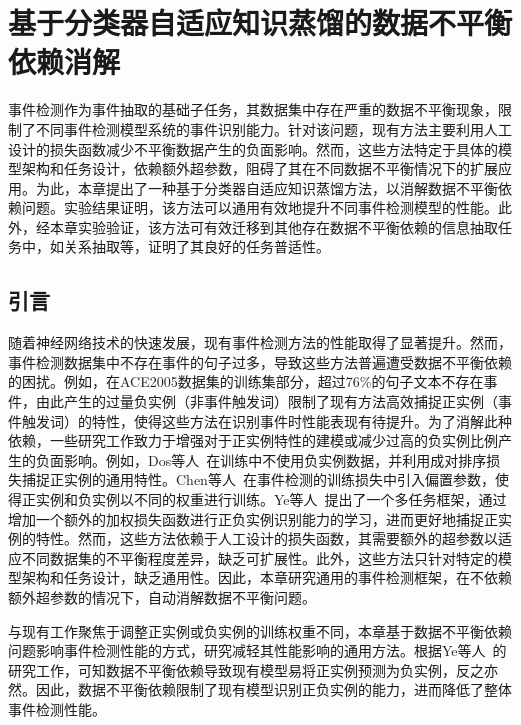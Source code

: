 \chapter{基于分类器自适应知识蒸馏的数据不平衡依赖消解}
\label{chap:chapter3}

事件检测作为事件抽取的基础子任务，其数据集中存在严重的数据不平衡现象，限制了不同事件检测模型系统的事件识别能力。针对该问题，现有方法主要利用人工设计的损失函数减少不平衡数据产生的负面影响。然而，这些方法特定于具体的模型架构和任务设计，依赖额外超参数，阻碍了其在不同数据不平衡情况下的扩展应用。为此，本章提出了一种基于分类器自适应知识蒸馏方法，以消解数据不平衡依赖问题。实验结果证明，该方法可以通用有效地提升不同事件检测模型的性能。此外，经本章实验验证，该方法可有效迁移到其他存在数据不平衡依赖的信息抽取任务中，如关系抽取等，证明了其良好的任务普适性。

\section{引言}
随着神经网络技术的快速发展，现有事件检测方法的性能取得了显著提升。然而，事件检测数据集中不存在事件的句子过多，导致这些方法普遍遭受数据不平衡依赖的困扰。例如，在ACE2005数据集的训练集部分，超过76\%的句子文本不存在事件，由此产生的过量负实例（非事件触发词）限制了现有方法高效捕捉正实例（事件触发词）的特性，使得这些方法在识别事件时性能表现有待提升。为了消解此种依赖，一些研究工作致力于增强对于正实例特性的建模或减少过高的负实例比例产生的负面影响。例如，Dos等人~\cite{dos2015classifying}在训练中不使用负实例数据，并利用成对排序损失捕捉正实例的通用特性。Chen等人~\cite{chen2018collective}在事件检测的训练损失中引入偏置参数，使得正实例和负实例以不同的权重进行训练。Ye等人~\cite{ye2019exploiting}提出了一个多任务框架，通过增加一个额外的加权损失函数进行正负实例识别能力的学习，进而更好地捕捉正实例的特性。然而，这些方法依赖于人工设计的损失函数，其需要额外的超参数以适应不同数据集的不平衡程度差异，缺乏可扩展性。此外，这些方法只针对特定的模型架构和任务设计，缺乏通用性。因此，本章研究通用的事件检测框架，在不依赖额外超参数的情况下，自动消解数据不平衡问题。

与现有工作聚焦于调整正实例或负实例的训练权重不同，本章基于数据不平衡依赖问题影响事件检测性能的方式，研究减轻其性能影响的通用方法。根据Ye等人~\cite{ye2019exploiting}的研究工作，可知数据不平衡依赖导致现有模型易将正实例预测为负实例，反之亦然。因此，数据不平衡依赖限制了现有模型识别正负实例的能力，进而降低了整体事件检测性能。

